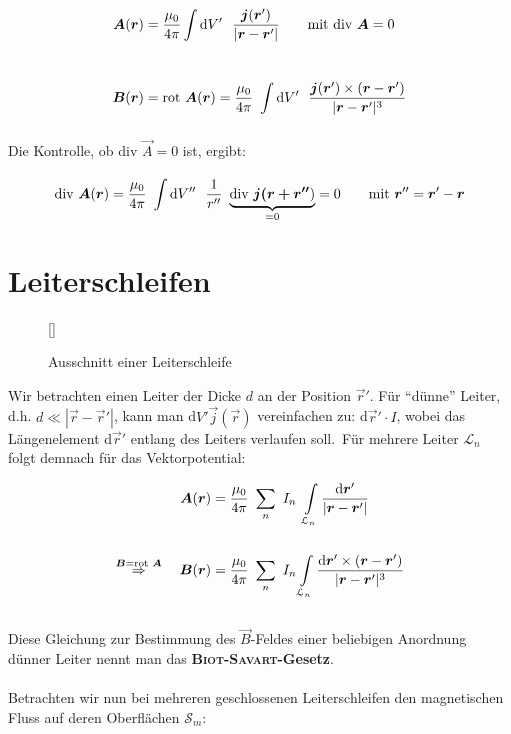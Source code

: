 \begin{align*}
\vec{A}(\vec{r}) &= \frac{\mu_0}{4\pi}\Int{}{}{V'} \ \frac{\vec{j}(\vec{r}')}{|\vec{r}-\vec{r}'|} \qquad \text{mit div }\vec{A} = 0 \\
\ \\
\vec{B}(\vec{r}) &= \rot \vec{A}(\vec{r}) = \frac{\mu_0}{4\pi}\ \Int {}{}{V'} \ \frac{\vec{j}(\vec{r}')\times (\vec{r}-\vec{r}')}{|\vec{r}-\vec{r}'|^3}
\end{align*}

Die Kontrolle, ob div $\vec{A} =0$ ist, ergibt:

\begin{equation*}
\div\vec{A}(\vec{r}) = \frac{\mu_0}{4\pi} \ \Int{}{}{V''}\ \frac{1}{r''} \ \underbrace{\div\vec{j(\vec{r}+\vec{r}''})}_{=0}=0 \qquad \text{mit } \vec{r}'' = \vec{r}'-\vec{r}
\end{equation*}

\section{Leiterschleifen}

\begin{wrapfigure}[]{l}[0cm]{0cm}
	\raisebox{0pt}[\dimexpr{}\baselineskip\relax]{
		\colorbox{hgrey}{
		}
	}
	\caption{Ausschnitt einer Leiterschleife}
\end{wrapfigure}
Wir betrachten einen Leiter der Dicke $d$ an der Position $\vec{r}'$. Für "`dünne"' Leiter, d.h. $d \ll |\vec{r}-\vec{r}'|$, kann man d$V' \vec{j}(\vec{r})$ vereinfachen zu: d$\vec{r}' \cdot I$, wobei das Längenelement d$\vec{r}'$ entlang des Leiters verlaufen soll.\
Für mehrere Leiter $\mathcal{L}_n$ folgt demnach für das Vektorpotential:

\begin{align*}
\vec{A}(\vec{r}) &= \frac{\mu_0}{4\pi}\ \sum_n \ I_n \ \int\limits_{\mathcal{L}_n} \frac{\mathrm{d}\vec{r}'}{|\vec{r}-\vec{r}'|}\\
\ \\
\overset{\vec{B}= \rot\vec{A}}{\Rightarrow} \quad \vec{B}(\vec{r}) &= \frac{\mu_0}{4\pi} \ \sum_n \ I_n \int\limits_{\mathcal{L}_n} \frac{\mathrm{d}\vec{r}' \times (\vec{r}-\vec{r}')}{|\vec{r}-\vec{r}'|^3}
\end{align*}
\ \\
Diese Gleichung zur Bestimmung des $\vec{B}$-Feldes einer beliebigen Anordnung dünner Leiter nennt man das \textbf{\textsc{Biot-Savart}-Gesetz}.\
\\
\ \\
Betrachten wir nun bei mehreren geschlossenen Leiterschleifen den magnetischen Fluss auf deren Oberflächen $\mathcal{S}_m$:


